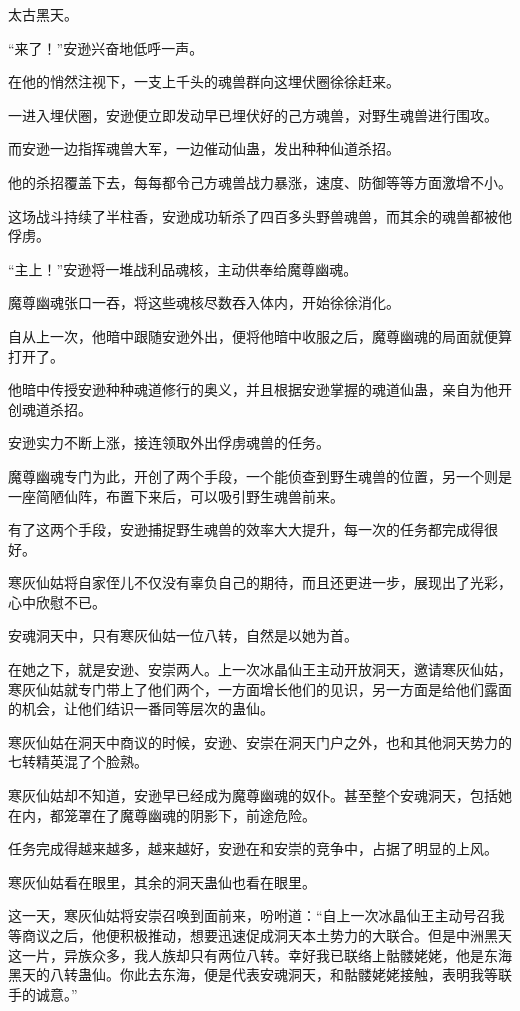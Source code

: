 
\begin{this_body}

太古黑天。

“来了！”安逊兴奋地低呼一声。

在他的悄然注视下，一支上千头的魂兽群向这埋伏圈徐徐赶来。

一进入埋伏圈，安逊便立即发动早已埋伏好的己方魂兽，对野生魂兽进行围攻。

而安逊一边指挥魂兽大军，一边催动仙蛊，发出种种仙道杀招。

他的杀招覆盖下去，每每都令己方魂兽战力暴涨，速度、防御等等方面激增不小。

这场战斗持续了半柱香，安逊成功斩杀了四百多头野兽魂兽，而其余的魂兽都被他俘虏。

“主上！”安逊将一堆战利品魂核，主动供奉给魔尊幽魂。

魔尊幽魂张口一吞，将这些魂核尽数吞入体内，开始徐徐消化。

自从上一次，他暗中跟随安逊外出，便将他暗中收服之后，魔尊幽魂的局面就便算打开了。

他暗中传授安逊种种魂道修行的奥义，并且根据安逊掌握的魂道仙蛊，亲自为他开创魂道杀招。

安逊实力不断上涨，接连领取外出俘虏魂兽的任务。

魔尊幽魂专门为此，开创了两个手段，一个能侦查到野生魂兽的位置，另一个则是一座简陋仙阵，布置下来后，可以吸引野生魂兽前来。

有了这两个手段，安逊捕捉野生魂兽的效率大大提升，每一次的任务都完成得很好。

寒灰仙姑将自家侄儿不仅没有辜负自己的期待，而且还更进一步，展现出了光彩，心中欣慰不已。

安魂洞天中，只有寒灰仙姑一位八转，自然是以她为首。

在她之下，就是安逊、安崇两人。上一次冰晶仙王主动开放洞天，邀请寒灰仙姑，寒灰仙姑就专门带上了他们两个，一方面增长他们的见识，另一方面是给他们露面的机会，让他们结识一番同等层次的蛊仙。

寒灰仙姑在洞天中商议的时候，安逊、安崇在洞天门户之外，也和其他洞天势力的七转精英混了个脸熟。

寒灰仙姑却不知道，安逊早已经成为魔尊幽魂的奴仆。甚至整个安魂洞天，包括她在内，都笼罩在了魔尊幽魂的阴影下，前途危险。

任务完成得越来越多，越来越好，安逊在和安崇的竞争中，占据了明显的上风。

寒灰仙姑看在眼里，其余的洞天蛊仙也看在眼里。

这一天，寒灰仙姑将安崇召唤到面前来，吩咐道：“自上一次冰晶仙王主动号召我等商议之后，他便积极推动，想要迅速促成洞天本土势力的大联合。但是中洲黑天这一片，异族众多，我人族却只有两位八转。幸好我已联络上骷髅姥姥，他是东海黑天的八转蛊仙。你此去东海，便是代表安魂洞天，和骷髅姥姥接触，表明我等联手的诚意。”


\end{this_body}
